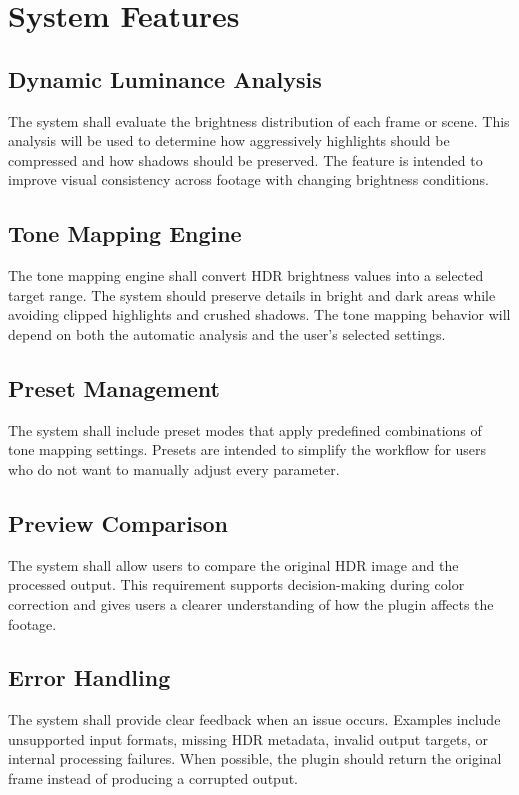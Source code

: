 \documentclass[12pt]{article}
\begin{document}

\section{System Features}

\subsection{Dynamic Luminance Analysis}
The system shall evaluate the brightness distribution of each frame or scene. This analysis will be used to determine how aggressively highlights should be compressed and how shadows should be preserved. The feature is intended to improve visual consistency across footage with changing brightness conditions.

\subsection{Tone Mapping Engine}
The tone mapping engine shall convert HDR brightness values into a selected target range. The system should preserve details in bright and dark areas while avoiding clipped highlights and crushed shadows. The tone mapping behavior will depend on both the automatic analysis and the user's selected settings.

\subsection{Preset Management}
The system shall include preset modes that apply predefined combinations of tone mapping settings. Presets are intended to simplify the workflow for users who do not want to manually adjust every parameter.

\subsection{Preview Comparison}
The system shall allow users to compare the original HDR image and the processed output. This requirement supports decision-making during color correction and gives users a clearer understanding of how the plugin affects the footage.

\subsection{Error Handling}
The system shall provide clear feedback when an issue occurs. Examples include unsupported input formats, missing HDR metadata, invalid output targets, or internal processing failures. When possible, the plugin should return the original frame instead of producing a corrupted output.
\end{document}
